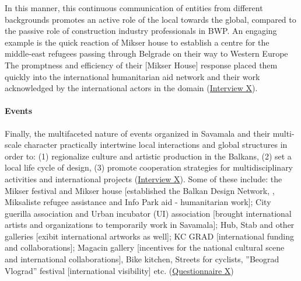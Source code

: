 \documentclass[11pt]{report}
\begin{document}
In this manner, this continuous communication of entities from different backgrounds promotes an active role of the local towards the global, compared to the passive role of construction industry professionals in BWP. An engaging example is the quick reaction of Mikser house to establish a centre for the middle-east refugees passing through Belgrade on their way to Western Europe
The promptness and efficiency of their [Mikser House] response placed them quickly into the international humanitarian aid network and their work acknowledged by the international actors in the domain (\href{InterviewX}{Interview X}).

\paragraph{Events}

Finally, the multifaceted nature of events organized in Savamala and their multi-scale character practically intertwine local interactions and global structures in order to:
(1) regionalize culture and artistic production in the Balkans,
(2) set a local life cycle of design,
(3) promote cooperation strategies for multidisciplinary activities and international projects (\href{InterviewX}{Interview X}).
Some of these include: the Mikser festival and Mikser house [established the Balkan Design Network,  , Miksaliste refugee assistance and Info Park aid - humanitarian work]; City guerilla association and Urban incubator (UI) association [brought international artists and organizations to temporarily work in Savamala]; Hub, Stab and other galleries [exibit international artworks as well]; KC GRAD [international funding and collaborations]; Magacin gallery [incentives for the national cultural scene and international collaborations], Bike kitchen, Streets for cyclists, ”Beograd Vlograd” festival [international visibility] etc.
(\href{Questionnaire Students Savamala}{Questionnaire X})
\\
\end{document}
